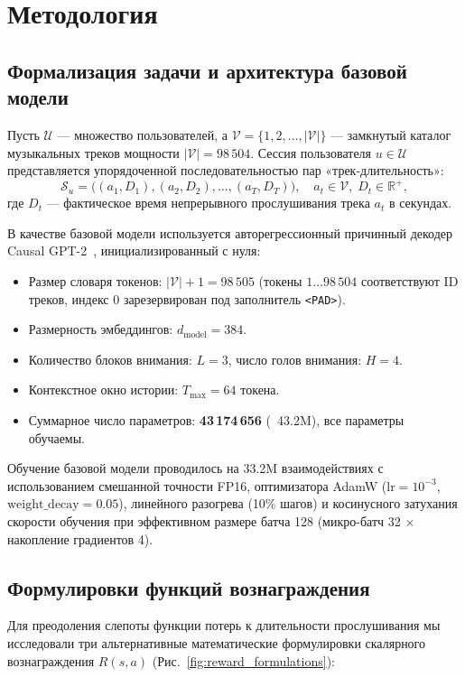 \section{Методология}
\label{sec:methodology}

\subsection{Формализация задачи и архитектура базовой модели}
Пусть $\mathcal{U}$ — множество пользователей, а $\mathcal{V} = \{1, 2, \dots, |\mathcal{V}|\}$ — замкнутый каталог музыкальных треков мощности $|\mathcal{V}| = 98\,504$. Сессия пользователя $u \in \mathcal{U}$ представляется упорядоченной последовательностью пар «трек-длительность»:
\begin{equation}
    \mathcal{S}_u = \big( (a_1, D_1), (a_2, D_2), \dots, (a_T, D_T) \big), \quad a_t \in \mathcal{V}, \; D_t \in \mathbb{R}^+,
\end{equation}
где $D_t$ — фактическое время непрерывного прослушивания трека $a_t$ в секундах.

В качестве базовой модели используется авторегрессионный причинный декодер Causal GPT-2~\cite{petrov2024aligning}, инициализированный с нуля:
\begin{itemize}
    \item Размер словаря токенов: $|\mathcal{V}| + 1 = 98\,505$ (токены $1 \dots 98\,504$ соответствуют ID треков, индекс $0$ зарезервирован под заполнитель \texttt{<PAD>}).
    \item Размерность эмбеддингов: $d_{\text{model}} = 384$.
    \item Количество блоков внимания: $L = 3$, число голов внимания: $H = 4$.
    \item Контекстное окно истории: $T_{\max} = 64$ токена.
    \item Суммарное число параметров: \textbf{43\,174\,656} (~43.2M), все параметры обучаемы.
\end{itemize}

Обучение базовой модели проводилось на 33.2M взаимодействиях с использованием смешанной точности FP16, оптимизатора AdamW ($\text{lr} = 10^{-3}$, $\text{weight\_decay} = 0.05$), линейного разогрева (10\% шагов) и косинусного затухания скорости обучения при эффективном размере батча 128 (микро-батч 32 $\times$ накопление градиентов 4).

\subsection{Формулировки функций вознаграждения}
Для преодоления слепоты функции потерь к длительности прослушивания мы исследовали три альтернативные математические формулировки скалярного вознаграждения $R(s, a)$ (Рис.~\ref{fig:reward_formulations}):


